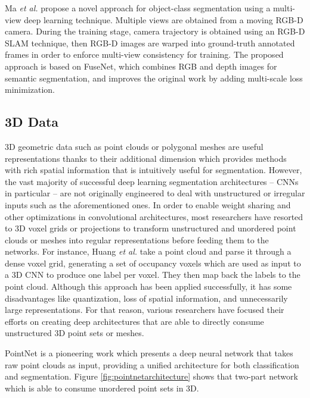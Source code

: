 Ma \emph{et al.}\cite{Ma2017} propose a novel approach for object-class segmentation using a multi-view deep learning technique. Multiple views are obtained from a moving RGB-D camera. During the training stage, camera trajectory is obtained using an RGB-D SLAM technique, then RGB-D images are warped into ground-truth annotated frames in order to enforce multi-view consistency for training. The proposed approach is based on FuseNet\cite{Hazirbas2016}, which combines \acs{RGB} and depth images for semantic segmentation, and improves the original work by adding multi-scale loss minimization.

\subsection{\acs{3D} Data}

\acs{3D} geometric data such as point clouds or polygonal meshes are useful representations thanks to their additional dimension which provides methods with rich spatial information that is intuitively useful for segmentation. However, the vast majority of successful deep learning segmentation architectures -- \acp{CNN} in particular -- are not originally engineered to deal with unstructured or irregular inputs such as the aforementioned ones. In order to enable weight sharing and other optimizations in convolutional architectures, most researchers have resorted to 3D voxel grids or projections to transform unstructured and unordered point clouds or meshes into regular representations before feeding them to the networks. For instance, Huang \emph{et al.}\cite{Huang2016} take a point cloud and parse it through a dense voxel grid, generating a set of occupancy voxels which are used as input to a 3D \acs{CNN} to produce one label per voxel. They then map back the labels to the point cloud. Although this approach has been applied successfully, it has some disadvantages like quantization, loss of spatial information, and unnecessarily large representations. For that reason, various researchers have focused their efforts on creating deep architectures that are able to directly consume unstructured \acs{3D} point sets or meshes.

PointNet\cite{Qi2016} is a pioneering work which presents a deep neural network that takes raw point clouds as input, providing a unified architecture for both classification and segmentation. Figure \ref{fig:pointnetarchitecture} shows that two-part network which is able to consume unordered point sets in 3D.


